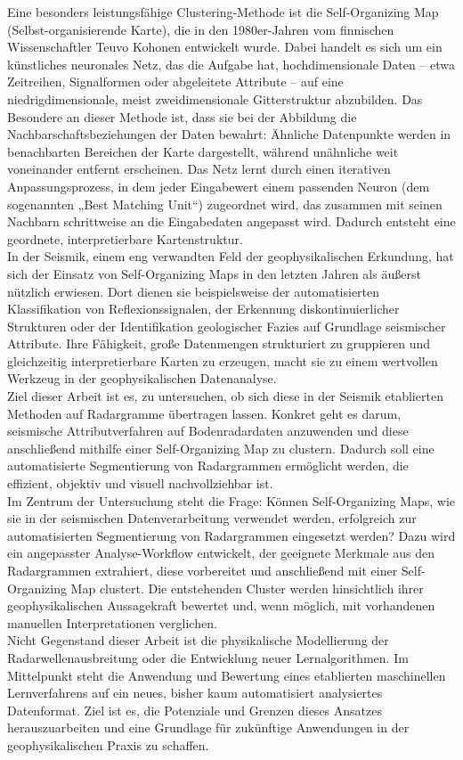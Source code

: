 Eine besonders leistungsfähige Clustering-Methode ist die Self-Organizing Map (Selbst-organisierende Karte), die in den 1980er-Jahren vom finnischen Wissenschaftler Teuvo Kohonen entwickelt wurde. Dabei handelt es sich um ein künstliches neuronales Netz, das die Aufgabe hat, hochdimensionale Daten – etwa Zeitreihen, Signalformen oder abgeleitete Attribute – auf eine niedrigdimensionale, meist zweidimensionale Gitterstruktur abzubilden. Das Besondere an dieser Methode ist, dass sie bei der Abbildung die Nachbarschaftsbeziehungen der Daten bewahrt: Ähnliche Datenpunkte werden in benachbarten Bereichen der Karte dargestellt, während unähnliche weit voneinander entfernt erscheinen. Das Netz lernt durch einen iterativen Anpassungsprozess, in dem jeder Eingabewert einem passenden Neuron (dem sogenannten „Best Matching Unit“) zugeordnet wird, das zusammen mit seinen Nachbarn schrittweise an die Eingabedaten angepasst wird. Dadurch entsteht eine geordnete, interpretierbare Kartenstruktur. \\
In der Seismik, einem eng verwandten Feld der geophysikalischen Erkundung, hat sich der Einsatz von Self-Organizing Maps in den letzten Jahren als äußerst nützlich erwiesen. Dort dienen sie beispielsweise der automatisierten Klassifikation von Reflexionssignalen, der Erkennung diskontinuierlicher Strukturen oder der Identifikation geologischer Fazies auf Grundlage seismischer Attribute. Ihre Fähigkeit, große Datenmengen strukturiert zu gruppieren und gleichzeitig interpretierbare Karten zu erzeugen, macht sie zu einem wertvollen Werkzeug in der geophysikalischen Datenanalyse. \\
Ziel dieser Arbeit ist es, zu untersuchen, ob sich diese in der Seismik etablierten Methoden auf Radargramme übertragen lassen. Konkret geht es darum, seismische Attributverfahren auf Bodenradardaten anzuwenden und diese anschließend mithilfe einer Self-Organizing Map zu clustern. Dadurch soll eine automatisierte Segmentierung von Radargrammen ermöglicht werden, die effizient, objektiv und visuell nachvollziehbar ist. \\
Im Zentrum der Untersuchung steht die Frage: Können Self-Organizing Maps, wie sie in der seismischen Datenverarbeitung verwendet werden, erfolgreich zur automatisierten Segmentierung von Radargrammen eingesetzt werden? Dazu wird ein angepasster Analyse-Workflow entwickelt, der geeignete Merkmale aus den Radargrammen extrahiert, diese vorbereitet und anschließend mit einer Self-Organizing Map clustert. Die entstehenden Cluster werden hinsichtlich ihrer geophysikalischen Aussagekraft bewertet und, wenn möglich, mit vorhandenen manuellen Interpretationen verglichen. \\
Nicht Gegenstand dieser Arbeit ist die physikalische Modellierung der Radarwellenausbreitung oder die Entwicklung neuer Lernalgorithmen. Im Mittelpunkt steht die Anwendung und Bewertung eines etablierten maschinellen Lernverfahrens auf ein neues, bisher kaum automatisiert analysiertes Datenformat. Ziel ist es, die Potenziale und Grenzen dieses Ansatzes herauszuarbeiten und eine Grundlage für zukünftige Anwendungen in der geophysikalischen Praxis zu schaffen. \\